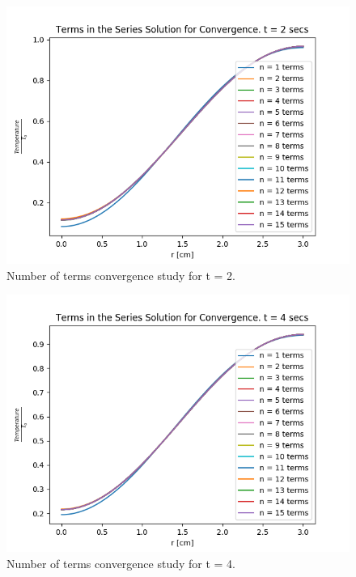 \documentclass[12pt,letterpaper]{article}
\begin{document}
\begin{figure}[htbp!]
  \begin{center}
    \includegraphics[scale=0.7]{terms_2.png}
  \end{center}
  \caption{Number of terms convergence study for t = 2.}
  \label{fig:2}
\end{figure}

\begin{figure}[htbp!]
  \begin{center}
    \includegraphics[scale=0.7]{terms_4.png}
  \end{center}
  \caption{Number of terms convergence study for t = 4.}
  \label{fig:4}
\end{figure}
\end{document}
